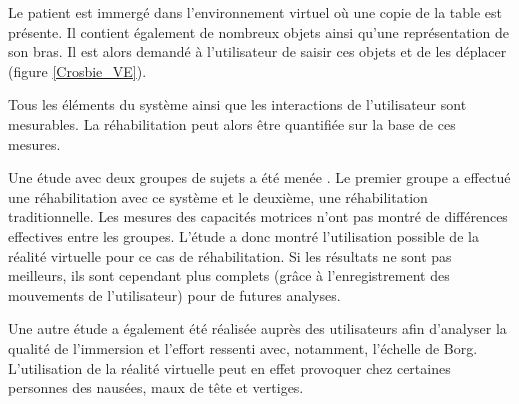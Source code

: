 		Le patient est immergé dans l'environnement virtuel où une copie de la table est présente. Il contient également de nombreux objets ainsi qu'une représentation de son bras. Il est alors demandé à l'utilisateur de saisir ces objets et de les déplacer (figure \ref{Crosbie_VE}).

		\begin{minipage}{\linewidth}
			\label{Crosbie_VE}
		\end{minipage}\medskip
		
		Tous les éléments du système ainsi que les interactions de l'utilisateur sont mesurables. La réhabilitation peut alors être quantifiée sur la base de ces mesures.
		
		Une étude avec deux groupes de sujets a été menée \cite{Crosbie_RandomizedStudy}. Le premier groupe a effectué une réhabilitation avec ce système et le deuxième, une réhabilitation traditionnelle. Les mesures des capacités motrices n'ont pas montré de différences effectives entre les groupes. L'étude a donc montré l'utilisation possible de la réalité virtuelle pour ce cas de réhabilitation. Si les résultats ne sont pas meilleurs, ils sont cependant plus complets (grâce à l'enregistrement des mouvements de l'utilisateur) pour de futures analyses.
		
		Une autre étude \cite{Crosbie_UserPerpective} a également été réalisée auprès des utilisateurs afin d'analyser la qualité de l'immersion et l'effort ressenti avec, notamment, l'échelle de Borg. L'utilisation de la réalité virtuelle peut en effet provoquer chez certaines personnes des nausées, maux de tête et vertiges.

